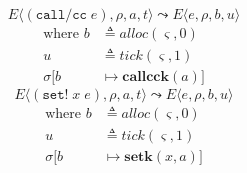 \documentclass[12pt,draft]{article}
\newcommand{\callccsyn}[1]{(\texttt{call/cc}\;#1)}
\newcommand{\setsyn}[2]{(\texttt{set!}\;#1\;#2)}
\begin{document}
\begin{multicols*}{2}
\[
E\langle
\callccsyn{e} , \rho , a , t
\rangle
\leadsto
E\langle
e , \rho , b , u
\rangle
\]
\vspace{-11mm}
\begin{align*}
\text{where } b &\triangleq alloc(\varsigma, 0) \\
u &\triangleq tick(\varsigma, 1) \\
\sigma[b &\mapsto \textbf{callcck}(a)]
\end{align*}
\vspace{-5mm}
\[
E\langle
\setsyn{x}{e} , \rho , a , t
\rangle
\leadsto
E\langle
e , \rho , b , u
\rangle
\]
\vspace{-11mm}
\begin{align*}
\text{where } b &\triangleq alloc(\varsigma, 0) \\
u &\triangleq tick(\varsigma, 1) \\
\sigma[b &\mapsto \textbf{setk}(x, a)]
\end{align*}


\vfill\null
\columnbreak


\end{multicols*}
\end{document}
